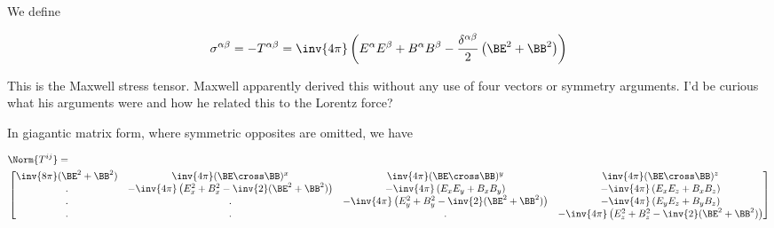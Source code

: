 We define

\begin{equation}\label{eqn:relativisticElectrodynamicsL23:n}
\sigma^{\alpha\beta}
=
-T^{\alpha\beta}
=
 \inv{4\pi} \left(
E^\alpha E^\beta
+B^\alpha B^\beta
- \frac{\delta^{\alpha\beta} }{2}
\left(
\BE^2 + \BB^2 
\right)
\right) 
\end{equation}

This is the Maxwell stress tensor.  Maxwell apparently derived this without any use of four vectors or symmetry arguments.  I'd be curious what his arguments were and how he related this to the Lorentz force?

In giagantic matrix form, where symmetric opposites are omitted, we have

\begin{equation}\label{eqn:relativisticElectrodynamicsL23:n}
\begin{aligned}
&\Norm{T^{ij}} = \\
&\begin{bmatrix}
\inv{8 \pi}(\BE^2 + \BB^2) & \inv{4\pi} (\BE \cross \BB)^x & \inv{4\pi} (\BE \cross \BB)^y & \inv{4\pi} (\BE \cross \BB)^z \\
. 
& -\inv{4 \pi}\left(E_x^2 + B_x^2 - \inv{2}(\BE^2 + \BB^2)\right) 
& -\inv{4 \pi}\left(E_x E_y + B_x B_y \right)
& -\inv{4 \pi}\left(E_x E_z + B_x B_z \right) \\
. & . & -\inv{4 \pi}\left(E_y^2 + B_y^2 - \inv{2}(\BE^2 + \BB^2)\right) & -\inv{4 \pi}\left(E_y E_z + B_y B_z \right) \\
. & . & . & -\inv{4 \pi}\left(E_z^2 + B_z^2 - \inv{2}(\BE^2 + \BB^2)\right) 
\end{bmatrix}
\end{aligned}
\end{equation}

\EndArticle
